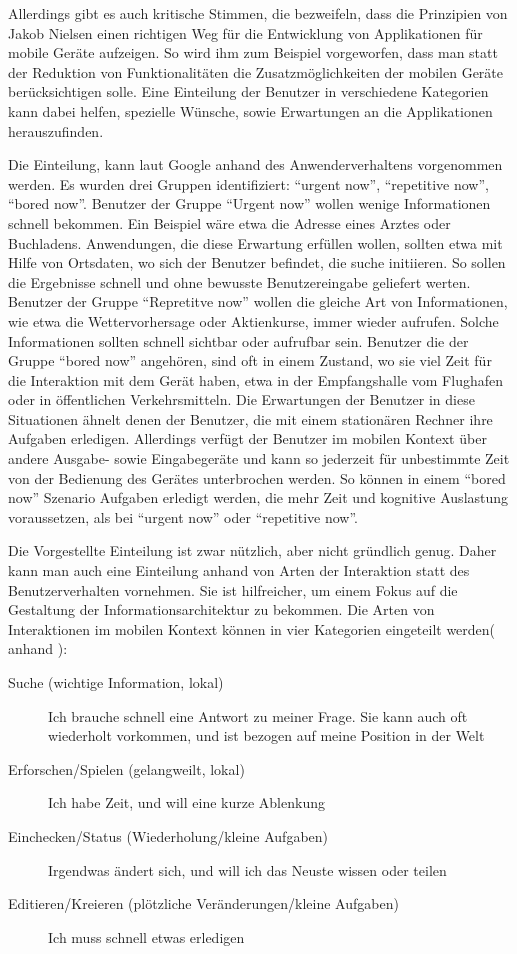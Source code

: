 Allerdings gibt es auch kritische Stimmen, die bezweifeln, dass die Prinzipien von Jakob Nielsen einen richtigen Weg für die Entwicklung von Applikationen für mobile Geräte aufzeigen\cite{kritikNielsen}. So wird ihm zum Beispiel vorgeworfen, dass man statt der Reduktion von Funktionalitäten die Zusatzmöglichkeiten der mobilen Geräte berücksichtigen solle. Eine Einteilung der Benutzer in verschiedene Kategorien kann dabei helfen, spezielle Wünsche, sowie Erwartungen an die Applikationen herauszufinden.

Die Einteilung, kann laut Google anhand des Anwenderverhaltens vorgenommen werden. Es wurden drei Gruppen identifiziert: “urgent now”, “repetitive now”, “bored now”\cite{googleUsers}. Benutzer der Gruppe “Urgent now” wollen wenige Informationen schnell bekommen. Ein Beispiel wäre etwa die Adresse eines  Arztes oder Buchladens. Anwendungen, die diese Erwartung erfüllen wollen, sollten etwa mit Hilfe von Ortsdaten, wo sich der Benutzer befindet, die suche initiieren. So sollen die Ergebnisse schnell und ohne bewusste Benutzereingabe geliefert werten. Benutzer der Gruppe “Repretitve now” wollen die gleiche Art von Informationen, wie etwa die Wettervorhersage oder Aktienkurse, immer wieder aufrufen. Solche Informationen sollten schnell sichtbar oder aufrufbar sein. Benutzer die der Gruppe “bored now” angehören, sind oft in einem Zustand, wo sie viel Zeit für die Interaktion mit dem Gerät haben, etwa in der Empfangshalle vom Flughafen oder in öffentlichen Verkehrsmitteln. Die Erwartungen der Benutzer in diese Situationen ähnelt denen der Benutzer, die mit einem stationären Rechner ihre Aufgaben erledigen. Allerdings verfügt der Benutzer im mobilen Kontext über andere Ausgabe- sowie Eingabegeräte und kann so jederzeit für unbestimmte Zeit von der Bedienung des Gerätes unterbrochen werden. So können in einem “bored now” Szenario Aufgaben erledigt werden, die mehr Zeit und kognitive Auslastung voraussetzen, als bei “urgent now” oder “repetitive now”.

Die Vorgestellte Einteilung ist zwar nützlich, aber nicht gründlich genug. Daher kann man auch eine Einteilung anhand von Arten der Interaktion statt des Benutzerverhalten vornehmen. Sie ist hilfreicher, um einem Fokus auf die Gestaltung der Informationsarchitektur zu bekommen. Die  Arten von Interaktionen im mobilen Kontext können in vier Kategorien eingeteilt werden( anhand \cite[Seite 50]{mobileFirst}):

\begin{description}
 	\item[Suche (wichtige Information, lokal)] Ich brauche schnell eine Antwort zu meiner Frage. Sie kann auch oft wiederholt vorkommen, und ist bezogen auf meine Position in der Welt
 	\item[Erforschen/Spielen (gelangweilt, lokal)] Ich habe Zeit, und will eine kurze Ablenkung
 	\item[Einchecken/Status (Wiederholung/kleine Aufgaben)] Irgendwas ändert sich, und will ich das Neuste wissen oder teilen
 	\item[Editieren/Kreieren (plötzliche Veränderungen/kleine Aufgaben)] Ich muss schnell etwas erledigen
 \end{description} 

